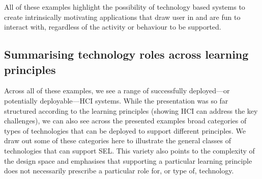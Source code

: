 \documentclass[prodmode,acmtochi]{acmsmall}
\newcommand{\GeraldineTODO}[1]{}
\begin{document}
All of these examples highlight the possibility of technology based systems to create intrinsically motivating applications that draw user in and are fun to interact with, regardless of the activity or behaviour to be supported. 
\GeraldineTODO{G: just wondered about also including some references to increasing principled work looking at how to interpret theories of motivation in systems and developing design strategies .. so SEL\ can also build on this growing understanding eg Consolvo et al 09 (see comment)  }

\GeraldineTODO{G: also wonder about for somewhere in section 5:\\ - pointing to/naming work on personal informatics for self reflection etc somewhere in section 5 eg li et al 12;\\  -  pointing to ESM\ work as a way of getting people to capture records in situ\\ }






\subsection{Summarising technology roles across learning principles}    

Across all of these examples, we see a range of successfully deployed---or potentially deployable---HCI systems. While the presentation was so far structured according to the learning principles (showing HCI can address the key challenges), we can also see across the presented examples broad categories of types of technologies that can be deployed to support different principles. We draw out some of these categories here to illustrate the general classes of technologies that can support SEL. This variety also points to the complexity of the design space and emphasises that supporting a particular learning principle does not necessarily prescribe a particular role for, or type of, technology.
\end{document}
